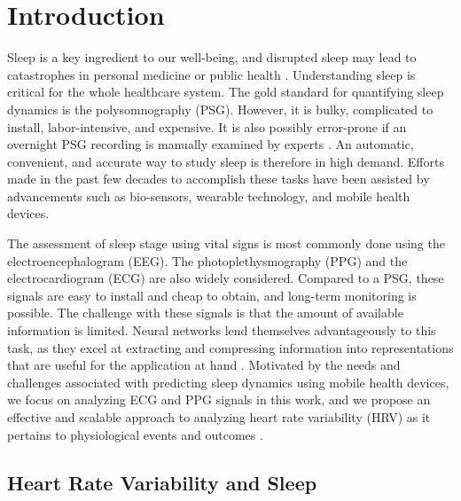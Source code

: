 \documentclass[10pt,a4paper,english]{amsart}
\begin{document}
\section{Introduction}\label{Sect:Introduction}

Sleep is a key ingredient to our well-being, and disrupted sleep may lead to catastrophes in personal medicine or public health \cite{Karni1994,Kang2009,Colten_Altevogt:2006}. Understanding sleep is critical for the whole healthcare system. The gold standard for quantifying sleep dynamics is the polysomnography (PSG). However, it is bulky, complicated to install, labor-intensive, and expensive. It is also possibly error-prone if an overnight PSG recording is manually examined by experts \cite{norman2000interobserver}. An automatic, convenient, and accurate way to study sleep is therefore in high demand. 
%
Efforts made in the past few decades to accomplish these tasks have been assisted by advancements such as bio-sensors, wearable technology, and mobile health devices. 
%

The assessment of sleep stage using vital signs is most commonly done using the electroencephalogram (EEG).  The photoplethysmography (PPG) and the electrocardiogram (ECG) are also widely considered.  Compared to a PSG, these signals are easy to install and cheap to obtain, and long-term monitoring is possible.  The challenge with these signals is that the amount of available information is limited.  Neural networks lend themselves advantageously to this task, as they excel at extracting and compressing information into representations that are useful for the application at hand \cite{LeCun2015}.
Motivated by the needs and challenges associated with predicting sleep dynamics using mobile health devices, we focus on analyzing ECG and PPG signals in this work, and we propose an effective and scalable approach to analyzing heart rate variability (HRV) as it pertains to physiological events and outcomes \cite{Malik_Camm:1995,Electrophysiology1043,Bravi2011}. 


\subsection{Heart Rate Variability and Sleep}
\end{document}
